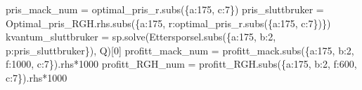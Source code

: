 \documentclass[
  12pt,
  a4paper,
  DIV=11,
  numbers=noendperiod]{scrartcl}
\newenvironment{Shaded}{\begin{snugshade}}{\end{snugshade}}
\newcommand{\DecValTok}[1]{\textcolor[rgb]{0.68,0.00,0.00}{#1}}
\newcommand{\NormalTok}[1]{\textcolor[rgb]{0.00,0.23,0.31}{#1}}
\newcommand{\OperatorTok}[1]{\textcolor[rgb]{0.37,0.37,0.37}{#1}}
\begin{document}
\begin{Shaded}
\begin{Highlighting}[]
\NormalTok{pris\_mack\_num }\OperatorTok{=}\NormalTok{ optimal\_pris\_r.subs(\{a:}\DecValTok{175}\NormalTok{, c:}\DecValTok{7}\NormalTok{\})}
\NormalTok{pris\_sluttbruker }\OperatorTok{=}\NormalTok{ Optimal\_pris\_RGH.rhs.subs(\{a:}\DecValTok{175}\NormalTok{, r:optimal\_pris\_r.subs(\{a:}\DecValTok{175}\NormalTok{, c:}\DecValTok{7}\NormalTok{\})\})}
\NormalTok{kvantum\_sluttbruker }\OperatorTok{=}\NormalTok{ sp.solve(Ettersporsel.subs(\{a:}\DecValTok{175}\NormalTok{, b:}\DecValTok{2}\NormalTok{, p:pris\_sluttbruker\}), Q)[}\DecValTok{0}\NormalTok{]}
\NormalTok{profitt\_mack\_num }\OperatorTok{=}\NormalTok{ profitt\_mack.subs(\{a:}\DecValTok{175}\NormalTok{, b:}\DecValTok{2}\NormalTok{, f:}\DecValTok{1000}\NormalTok{, c:}\DecValTok{7}\NormalTok{\}).rhs}\OperatorTok{*}\DecValTok{1000}
\NormalTok{profitt\_RGH\_num }\OperatorTok{=}\NormalTok{ profitt\_RGH.subs(\{a:}\DecValTok{175}\NormalTok{, b:}\DecValTok{2}\NormalTok{, f:}\DecValTok{600}\NormalTok{, c:}\DecValTok{7}\NormalTok{\}).rhs}\OperatorTok{*}\DecValTok{1000}


\end{Highlighting}
\end{Shaded}
\end{document}
